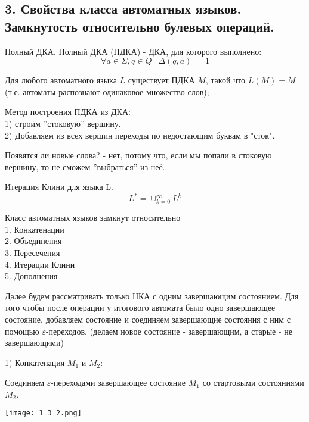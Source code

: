 \subsection{3. Свойства класса автоматных языков. Замкнутость относительно булевых операций.}

\Def Полный ДКА.
Полный ДКА (ПДКА) - ДКА, для которого выполнено:
$$\forall a \in \Sigma, q \in Q \,\,\, |\Delta (q, a)| = 1$$

\Statement Для любого автоматного языка $L$ существует ПДКА $M$, такой что $L(M) = M$ (т.е. автоматы распознают одинаковое множество слов);

Метод построения ПДКА из ДКА:\\
1) строим ''стоковую'' вершину.\\
2) Добавляем из всех вершин переходы по недостающим буквам в "сток".

\begin{figure}[h]
    \hspace{-4ex} \begin{minipage}[h]{1\linewidth}
    \end{minipage}
    \hspace{-4ex}
\end{figure}

Появятся ли новые слова? - нет, потому что, если мы попали в стоковую вершину, то не сможем ''выбраться'' из неё.

\Def Итерация Клини для языка L.
$$L^* = \cup_{k = 0}^{\infty}L^k$$

\Th Класс автоматных языков замкнут относительно\\
1. Конкатенации\\
2. Объединения\\
3. Пересечения\\
4. Итерации Клини\\
5. Дополнения

\Proof
Далее будем рассматривать только НКА с одним завершающим состоянием.
Для того чтобы после операции у итогового автомата было одно завершающее состояние, добавляем состояние и соединяем завершающие состояния с ним с помощью $\varepsilon$-переходов. (делаем новое состояние - завершающим, а старые - не завершающими)

1) Конкатенация $M_1$ и $M_2$:

Соединяем $\varepsilon$-переходами завершающее состояние $M_1$ со стартовыми состояниями $M_2$.
\begin{center}
\texttt{[image: 1\_3\_2.png]}
\end{center}

